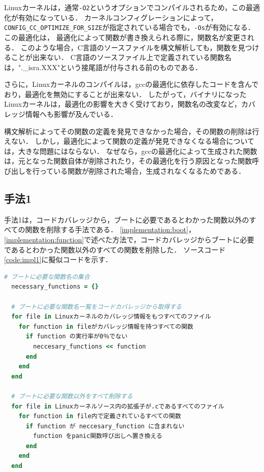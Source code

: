 \documentclass[graduation-thesis]{mlarticle}
\begin{document}
Linuxカーネルは，通常\texttt{-O2}というオプションでコンパイルされるため，この最適化が有効になっている．
カーネルコンフィグレーションによって，\texttt{CONFIG\_CC\_OPTIMIZE\_FOR\_SIZE}が指定されている場合でも，\texttt{-Os}が有効になる．
この最適化は，
最適化によって関数が書き換えられる際に，関数名が変更される．
このような場合，C言語のソースファイルを構文解析しても，関数を見つけることが出来ない．
C言語のソースファイル上で定義されている関数名は，".\_isra.XXX"という接尾語が付与される前のものである．

さらに，Linuxカーネルのコンパイルは，gccの最適化に依存したコードを含んでおり，最適化を無効にすることが出来ない．
したがって，バイナリになったLinuxカーネルは，最適化の影響を大きく受けており，関数名の改変など，カバレッジ情報へも影響が及んでいる．

構文解析によってその関数の定義を発見できなかった場合，その関数の削除は行えない．
しかし，最適化によって関数の定義が発見できなくなる場合については，大きな問題にはならない．
なぜなら，gccの最適化によって生成された関数は，元となった関数自体が削除されたり，その最適化を行う原因となった関数呼び出しを行っている関数が削除された場合，生成されなくなるためである．

\subsection{手法1}
\label{implementation:1}

手法1は，コードカバレッジから，ブートに必要であるとわかった関数以外のすべての関数を削除する手法である．
\ref{implementation:boot}，\ref{implementation:function}で述べた方法で，コードカバレッジからブートに必要であるとわかった関数以外のすべての関数を削除した．
ソースコード\ref{code:impl1}に擬似コードを示す．

\begin{lstlisting}[language=ruby, caption=手法1の擬似コード, label=code:impl1]
  # ブートに必要な関数名の集合
  necessary_functions = {}

  # ブートに必要な関数名一覧をコードカバレッジから取得する
  for file in Linuxカーネルのカバレッジ情報をもつすべてのファイル
    for function in fileがカバレッジ情報を持つすべての関数
      if function の実行率が0％でない
        neccesary_functions << function
      end
    end
  end

  # ブートに必要な関数以外をすべて削除する
  for file in Linuxカーネルソース内の拡張子が.cであるすべてのファイル
    for function in file内で定義されているすべての関数 
      if function が neccesary_function に含まれない
        function をpanic関数呼び出しへ置き換える
      end
    end
  end
\end{lstlisting}
\end{document}

